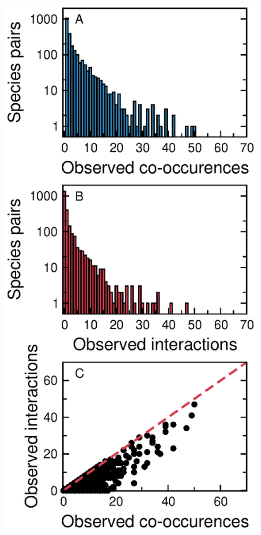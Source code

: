 \documentclass[12pt]{article}
\begin{document}
\begin{figure}[h!]
\begin{center}
      \includegraphics*[height=.6\textheight]{figures/GP_histogram.eps}
      \end{center}
      \end{figure}
\end{document}

